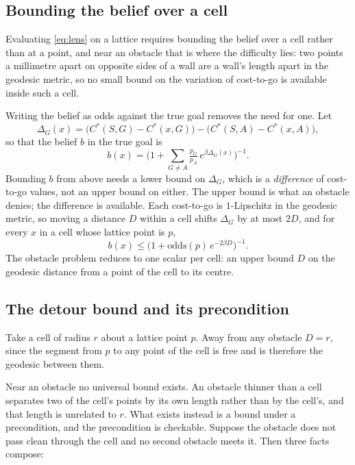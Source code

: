 \documentclass[journal]{IEEEtran}
\newcommand{\costto}[2]{C^{*}(#1, #2)}
\begin{document}
\subsection{Bounding the belief over a cell}

Evaluating \eqref{eq:lens} on a lattice requires bounding the belief over a
cell rather than at a point, and near an obstacle that is where the difficulty
lies: two points a millimetre apart on opposite sides of a wall are a wall's
length apart in the geodesic metric, so no small bound on the variation of
cost-to-go is available inside such a cell.

Writing the belief as odds against the true goal removes the need for one.
Let
\begin{equation}
\Delta_G(x) = \big( \costto{S}{G} - \costto{x}{G} \big)
            - \big( \costto{S}{A} - \costto{x}{A} \big) ,
\label{eq:delta}
\end{equation}
so that the belief $b$ in the true goal is
\begin{equation}
b(x) = \Big( 1 + \sum_{G \neq A}
  \tfrac{p_G}{p_A}\, e^{\beta \Delta_G(x)} \Big)^{-1} .
\label{eq:odds}
\end{equation}
Bounding $b$ from above needs a lower bound on $\Delta_G$, which is a
\emph{difference} of cost-to-go values, not an upper bound on either. The upper bound is what an
obstacle denies; the difference is available. Each cost-to-go is $1$-Lipschitz
in the geodesic metric, so moving a distance $D$ within a cell shifts
$\Delta_G$ by at most $2D$, and for every $x$ in a cell whose lattice point is
$p$,
\begin{equation}
b(x) \le \big( 1 + \mathrm{odds}(p)\, e^{-2\beta D} \big)^{-1} .
\label{eq:cellbound}
\end{equation}
The obstacle problem reduces to one scalar per cell: an upper bound $D$ on the
geodesic distance from a point of the cell to its centre.

\subsection{The detour bound and its precondition}

Take a cell of radius $r$ about a lattice point $p$. Away from any obstacle
$D = r$, since the segment from $p$ to any point of the cell is free and is
therefore the geodesic between them.

Near an obstacle no universal bound exists. An obstacle thinner than a cell
separates two of the cell's points by its own length rather than by the cell's,
and that length is unrelated to $r$. What exists instead is a bound under a
precondition, and the precondition is checkable. Suppose the obstacle does not
pass clean through the cell and no second obstacle meets it. Then three facts
compose:
\end{document}

